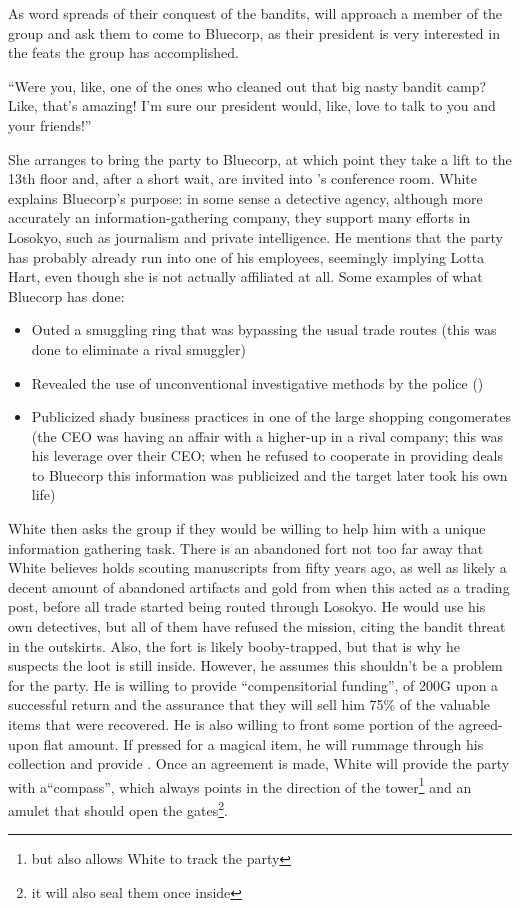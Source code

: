  As word spreads of their conquest of the bandits,  will approach a member of the group and ask them to come to Bluecorp, as their president is very interested in the feats the group has accomplished.\\
\begin{center}
``Were you, like, one of the ones who cleaned out that big nasty bandit camp? Like, that's amazing! I'm sure our president would, like, love to talk to you and your friends!''
\end{center}
She arranges to bring the party to Bluecorp, at which point they take a lift to the 13th floor and, after a short wait, are invited into 's conference room. White explains Bluecorp's purpose: in some sense a detective agency, although more accurately an information-gathering company, they support many efforts in Losokyo, such as journalism and private intelligence. He mentions that the party has probably already run into one of his employees, seemingly implying Lotta Hart, even though she is not actually affiliated at all. Some examples of what Bluecorp has done:
\begin{itemize}
\item Outed a smuggling ring that was bypassing the usual trade routes (this was done to eliminate a rival smuggler)
\item Revealed the use of unconventional investigative methods by the police ()
\item Publicized shady business practices in one of the large shopping congomerates (the CEO was having an affair with a higher-up in a rival company; this was his leverage over their CEO; when he refused to cooperate in providing deals to Bluecorp this information was publicized and the target later took his own life)
\end{itemize}
White then asks the group if they would be willing to help him with a unique information gathering task. There is an abandoned fort not too far away that White believes holds scouting manuscripts from fifty years ago, as well as likely a decent amount of abandoned artifacts and gold from when this acted as a trading post, before all trade started being routed through Losokyo. He would use his own detectives, but all of them have refused the mission, citing the bandit threat in the outskirts. Also, the fort is likely booby-trapped, but that is why he suspects the loot is still inside. However, he assumes this shouldn't be a problem for the party. He is willing to provide ``compensitorial funding'', of 200G upon a successful return and the assurance that they will sell him 75\% of the valuable items that were recovered. He is also willing to front some portion of the agreed-upon flat amount. If pressed for a magical item, he will rummage through his collection and provide . Once an agreement is made, White will provide the party with a``compass'', which always points in the direction of the tower\footnote{but also allows White to track the party} and an amulet that should open the gates\footnote{it will also seal them once inside}. \\

